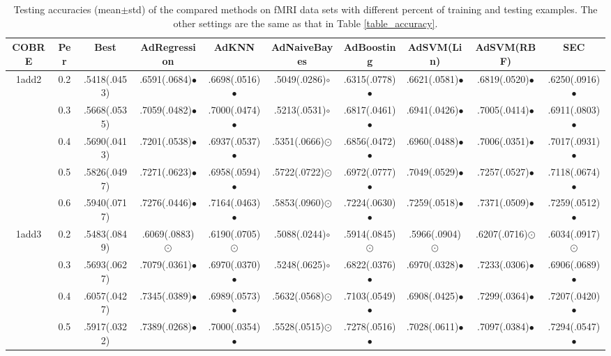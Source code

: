 \documentclass[10pt,journal,compsoc]{IEEEtran}
\begin{document}
\begin{table*}[!t]
\caption{Testing accuracies (mean$\pm$std) of the compared methods on fMRI data sets with different percent of training and testing examples. The other settings are the same as that in Table \ref{table_accuracy}.}
\label{table_frmi_acc}
\centering
\vskip -0.1in
{
\begin{tabular}{c||c|| c c c c c c c c }
\hline
COBRE& Per       &  Best   &  AdRegression   & AdKNN    & AdNaiveBayes    & AdBoosting &  AdSVM(Lin) & AdSVM(RBF) & SEC \\
\hline
1add2& 0.2 & .5418(.0453) & .6591(.0684)$\bullet$ & .6698(.0516)$\bullet$ & .5049(.0286)$\circ$ & .6315(.0778)$\bullet$ & .6621(.0581)$\bullet$ & .6819(.0520)$\bullet$ & .6250(.0916)$\bullet$ \\
&0.3 & .5668(.0535) & .7059(.0482)$\bullet$ & .7000(.0474)$\bullet$ & .5213(.0531)$\circ$ & .6817(.0461)$\bullet$ & .6941(.0426)$\bullet$ & .7005(.0414)$\bullet$ & .6911(.0803)$\bullet$ \\
&0.4 & .5690(.0413) & .7201(.0538)$\bullet$ & .6937(.0537)$\bullet$ & .5351(.0666){\tiny $\odot$} & .6856(.0472)$\bullet$ & .6960(.0488)$\bullet$ & .7006(.0351)$\bullet$ & .7017(.0931)$\bullet$ \\
&0.5 & .5826(.0497) & .7271(.0623)$\bullet$ & .6958(.0594)$\bullet$ & .5722(.0722){\tiny $\odot$} & .6972(.0777)$\bullet$ & .7049(.0529)$\bullet$ & .7257(.0527)$\bullet$ & .7118(.0674)$\bullet$ \\
&0.6 & .5940(.0717) & .7276(.0446)$\bullet$ & .7164(.0463)$\bullet$& .5853(.0960){\tiny $\odot$} & .7224(.0630)$\bullet$ & .7259(.0518)$\bullet$ & .7371(.0509)$\bullet$ & .7259(.0512)$\bullet$ \\
\hline
1add3& 0.2 & .5483(.0849) & .6069(.0883){\tiny $\odot$} & .6190(.0705){\tiny $\odot$} & .5088(.0244)$\circ$ & .5914(.0845){\tiny $\odot$} & .5966(.0904){\tiny $\odot$} & .6207(.0716){\tiny $\odot$} & .6034(.0917){\tiny $\odot$} \\
     & 0.3 & .5693(.0627) & .7079(.0361)$\bullet$ & .6970(.0370)$\bullet$ & .5248(.0625)$\circ$ & .6822(.0376)$\bullet$ & .6970(.0328)$\bullet$ & .7233(.0306)$\bullet$ & .6906(.0689)$\bullet$ \\
     & 0.4 & .6057(.0427) & .7345(.0389)$\bullet$ & .6989(.0573)$\bullet$ & .5632(.0568){\tiny $\odot$} & .7103(.0549)$\bullet$ & .6908(.0425)$\bullet$ & .7299(.0364)$\bullet$ & .7207(.0420)$\bullet$ \\
     & 0.5 & .5917(.0322) & .7389(.0268)$\bullet$ & .7000(.0354)$\bullet$ & .5528(.0515){\tiny $\odot$} & .7278(.0516)$\bullet$ & .7028(.0611)$\bullet$ & .7097(.0384)$\bullet$ & .7294(.0547)$\bullet$ \\

\end{tabular}}
\end{table*}
\end{document}
